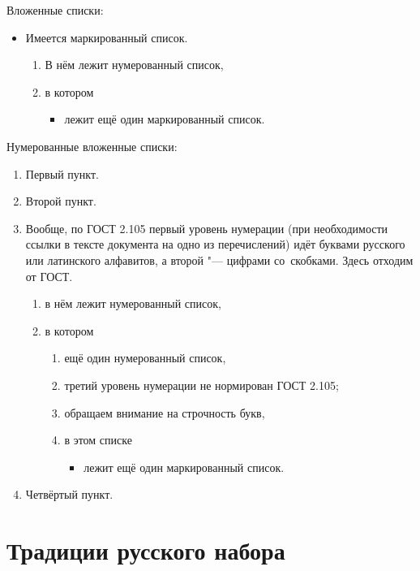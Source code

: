 \noindent Вложенные списки:
\begin{itemize}
  \item Имеется маркированный список.
  \begin{enumerate}
    \item В нём лежит нумерованный список,
    \item в котором
    \begin{itemize}
      \item лежит ещё один маркированный список.
    \end{itemize}
  \end{enumerate}
\end{itemize}

\noindent Нумерованные вложенные списки:
\begin{enumerate}
  \item Первый пункт.
  \item Второй пункт.
  \item Вообще, по ГОСТ 2.105 первый уровень нумерации
  (при необходимости ссылки в тексте документа на одно из перечислений)
  идёт буквами русского или латинского алфавитов,
  а второй "--- цифрами со~скобками.
  Здесь отходим от ГОСТ.
    \begin{enumerate}
      \item в нём лежит нумерованный список,
      \item в котором
        \begin{enumerate}
          \item ещё один нумерованный список,
          \item третий уровень нумерации не нормирован ГОСТ 2.105;
          \item обращаем внимание на строчность букв,
          \item в этом списке
          \begin{itemize}
            \item лежит ещё один маркированный список.
          \end{itemize}
        \end{enumerate}

    \end{enumerate}

  \item Четвёртый пункт.
\end{enumerate}

\section{Традиции русского набора}

